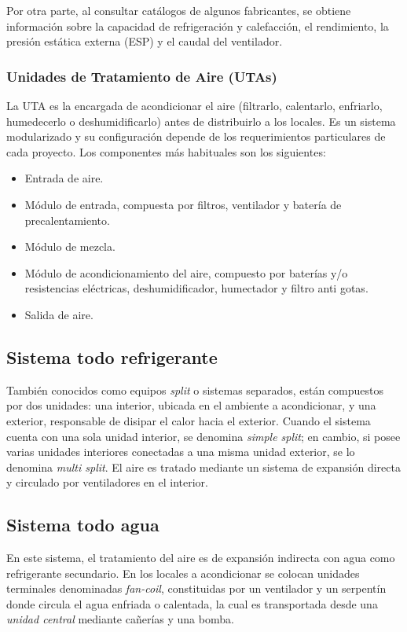 Por otra parte, al consultar catálogos de algunos fabricantes, se obtiene información sobre la capacidad de refrigeración y calefacción, el rendimiento, la presión estática externa (ESP) y el caudal del ventilador.

\subsubsection{Unidades de Tratamiento de Aire (UTAs)}

La UTA es la encargada de acondicionar el aire (filtrarlo, calentarlo, enfriarlo, humedecerlo o deshumidificarlo) antes de distribuirlo a los locales. Es un sistema modularizado y su configuración depende de los requerimientos particulares de cada proyecto. Los componentes más habituales son los siguientes:
\begin{itemize}
	\item Entrada de aire.
	\item Módulo de entrada, compuesta por filtros, ventilador y batería de precalentamiento.
	\item Módulo de mezcla.
	\item Módulo de acondicionamiento del aire, compuesto por baterías y/o resistencias eléctricas, deshumidificador, humectador y filtro anti gotas.
	\item Salida de aire.
\end{itemize}

\subsection{Sistema todo refrigerante}

También conocidos como equipos \emph{split} o sistemas separados, están compuestos por dos unidades: una interior, ubicada en el ambiente a acondicionar, y una exterior, responsable de disipar el calor hacia el exterior. Cuando el sistema cuenta con una sola unidad interior, se denomina \emph{simple split}; en cambio, si posee varias unidades interiores conectadas a una misma unidad exterior, se lo denomina \emph{multi split}. El aire es tratado mediante un sistema de expansión directa y circulado por ventiladores en el interior.

\subsection{Sistema todo agua}

En este sistema, el tratamiento del aire es de expansión indirecta con agua como refrigerante secundario. En los locales a acondicionar se colocan unidades terminales denominadas \emph{fan-coil}, constituidas por un ventilador y un serpentín donde circula el agua enfriada o calentada, la cual es transportada desde una \emph{unidad central} mediante cañerías y una bomba.

